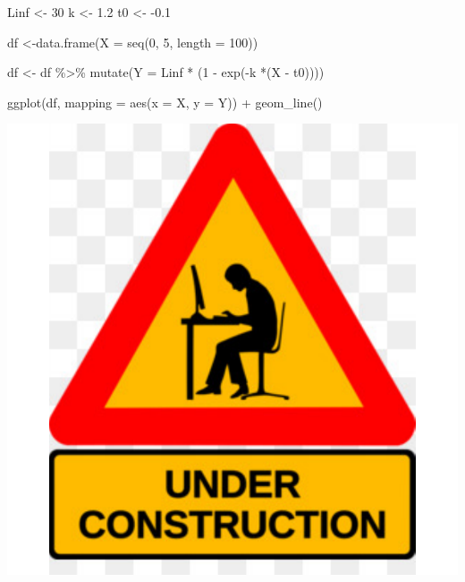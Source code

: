 \documentclass[
]{book}
\newenvironment{Shaded}{\begin{snugshade}}{\end{snugshade}}
\newcommand{\AttributeTok}[1]{\textcolor[rgb]{0.77,0.63,0.00}{#1}}
\newcommand{\DecValTok}[1]{\textcolor[rgb]{0.00,0.00,0.81}{#1}}
\newcommand{\FloatTok}[1]{\textcolor[rgb]{0.00,0.00,0.81}{#1}}
\newcommand{\FunctionTok}[1]{\textcolor[rgb]{0.00,0.00,0.00}{#1}}
\newcommand{\NormalTok}[1]{#1}
\newcommand{\OtherTok}[1]{\textcolor[rgb]{0.56,0.35,0.01}{#1}}
\newcommand{\SpecialCharTok}[1]{\textcolor[rgb]{0.00,0.00,0.00}{#1}}
\begin{document}
\begin{Shaded}
\begin{Highlighting}[]
\NormalTok{Linf }\OtherTok{\textless{}{-}} \DecValTok{30}
\NormalTok{k }\OtherTok{\textless{}{-}} \FloatTok{1.2}
\NormalTok{t0 }\OtherTok{\textless{}{-}} \SpecialCharTok{{-}}\FloatTok{0.1}

\NormalTok{df }\OtherTok{\textless{}{-}}\FunctionTok{data.frame}\NormalTok{(}\AttributeTok{X =} \FunctionTok{seq}\NormalTok{(}\DecValTok{0}\NormalTok{, }\DecValTok{5}\NormalTok{, }\AttributeTok{length =} \DecValTok{100}\NormalTok{))}

\NormalTok{df }\OtherTok{\textless{}{-}}\NormalTok{ df }\SpecialCharTok{\%\textgreater{}\%} \FunctionTok{mutate}\NormalTok{(}\AttributeTok{Y =}\NormalTok{ Linf }\SpecialCharTok{*}\NormalTok{ (}\DecValTok{1} \SpecialCharTok{{-}} \FunctionTok{exp}\NormalTok{(}\SpecialCharTok{{-}}\NormalTok{k }\SpecialCharTok{*}\NormalTok{(X }\SpecialCharTok{{-}}\NormalTok{ t0))))}

\FunctionTok{ggplot}\NormalTok{(df, }\AttributeTok{mapping =} \FunctionTok{aes}\NormalTok{(}\AttributeTok{x =}\NormalTok{ X, }\AttributeTok{y =}\NormalTok{ Y)) }\SpecialCharTok{+}
  \FunctionTok{geom\_line}\NormalTok{()}
\end{Highlighting}
\end{Shaded}

\begin{center}\includegraphics{probest-cambientais_files/figure-latex/unnamed-chunk-234-1} \end{center}
\end{document}
